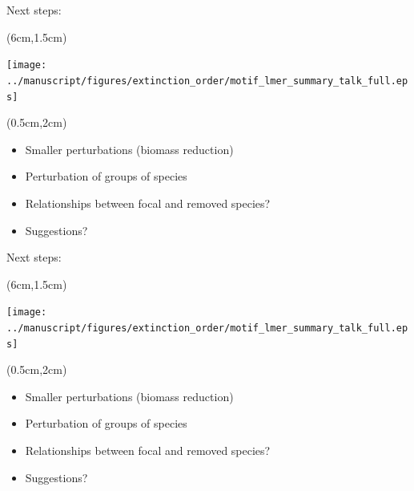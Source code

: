 \documentclass{beamer}
\newcommand*\whitem{%
  \item[\color{white}\scalebox{0.9}{\textbullet}]}
\begin{document}

  \begin{frame}{Next steps:}

    \begin{textblock*}{.5\textwidth}(6cm,1.5cm)
    \begin{center}
      \texttt{[image: ../manuscript/figures/extinction\_order/motif\_lmer\_summary\_talk\_full.eps]}
    \end{center}
    \end{textblock*}

    \begin{textblock*}{.5\textwidth}(0.5cm,2cm)
      \begin{itemize}
        \item Smaller perturbations (biomass reduction)
        \item Perturbation of groups of species
        \item Relationships between focal and removed species?
        \whitem {\color{white}Suggestions?}
      \end{itemize}
    \end{textblock*}

    \end{frame}

  \begin{frame}{Next steps:}

    \begin{textblock*}{.5\textwidth}(6cm,1.5cm)
    \begin{center}
      \texttt{[image: ../manuscript/figures/extinction\_order/motif\_lmer\_summary\_talk\_full.eps]}
    \end{center}
    \end{textblock*}

    \begin{textblock*}{.5\textwidth}(0.5cm,2cm)
      \begin{itemize}
        \item Smaller perturbations (biomass reduction)
        \item Perturbation of groups of species
        \item Relationships between focal and removed species?
        \item Suggestions?
      \end{itemize}
    \end{textblock*}

    \end{frame}
\end{document}
